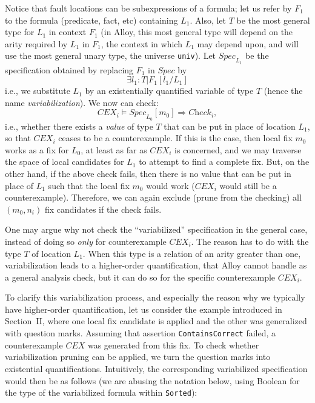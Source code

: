 Notice that fault locations can be subexpressions of a formula; let us refer by $F_1$ to the formula (predicate, fact, etc) containing $L_1$. Also, let $T$ be the most general type for $L_1$ in context $F_1$ (in Alloy, this most general type will depend on the arity required by $L_1$ in $F_1$, the context in which $L_1$ may depend upon, and will use the most general unary type, the universe \texttt{univ}). Let $\textit{Spec}_{L_1}$ be the specification obtained by replacing $F_1$ in $\textit{Spec}$ by 
\begin{displaymath}
\exists l_1: T \vert F_1[l_1/L_1] 
\end{displaymath}
i.e., we substitute $L_1$ by an existentially quantified variable of type $T$ (hence the name \emph{variabilization}). We now can check: 
\begin{displaymath}
    \textit{CEX}_i \models \textit{Spec}_{L_0}[m_0] \Rightarrow \textit{Check}_i,
\end{displaymath}
i.e., whether there exists a \emph{value} of type $T$ that can be put in place of location $L_1$, so that $\textit{CEX}_i$ ceases to be a counterexample. If this is the case, then local fix $m_0$ works as a fix for $L_0$, at least as far as $\textit{CEX}_i$ is concerned, and we may traverse the space of local candidates for $L_1$ to attempt to find a complete fix. But, on the other hand, if the above check fails, then there is no value that can be put in place of $L_1$ such that the local fix $m_0$ would work ($\textit{CEX}_i$ would still be a counterexample). Therefore, we can again exclude (prune from the checking) all $(m_0, n_i)$ fix candidates if the check fails. 

One may argue why not check the ``variabilized'' specification in the general case, instead of doing so \emph{only} for counterexample $\textit{CEX}_i$. The reason has to do with the type $T$ of location $L_1$. When this type is a relation of an arity greater than one, variabilization leads to a higher-order quantification, that Alloy cannot handle as a general analysis check, but it can do so for the specific counterexample $\textit{CEX}_i$. 

To clarify this variabilization process, and especially the reason why we typically have higher-order quantification, let us consider the example introduced in Section~II, where one local fix candidate is applied and the other was generalized with question marks. Assuming that assertion \texttt{ContainsCorrect} failed, a counterexample $\textit{CEX}$ was generated from this fix. To check whether variabilization pruning can be applied, we turn the question marks into existential quantifications. Intuitively, the corresponding variabilized specification would then be as follows (we are abusing the notation below, using Boolean for the type of the variabilized formula within \texttt{Sorted}):

